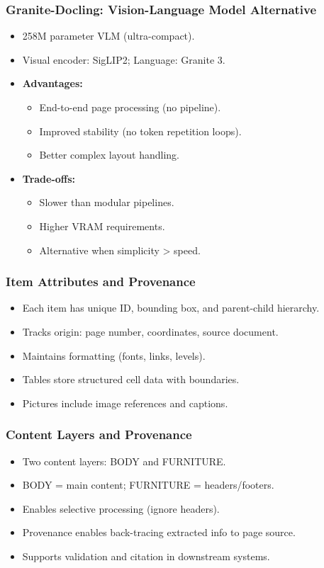 \begin{frame}[fragile]\frametitle{Granite-Docling: Vision-Language Model Alternative}
      \begin{itemize}
        \item 258M parameter VLM (ultra-compact).
        \item Visual encoder: SigLIP2; Language: Granite 3.
        \item \textbf{Advantages:}
        \begin{itemize}
          \item End-to-end page processing (no pipeline).
          \item Improved stability (no token repetition loops).
          \item Better complex layout handling.
        \end{itemize}
        \item \textbf{Trade-offs:}
        \begin{itemize}
          \item Slower than modular pipelines.
          \item Higher VRAM requirements.
          \item Alternative when simplicity > speed.
        \end{itemize}
      \end{itemize}
\end{frame}
\begin{frame}[fragile]\frametitle{Item Attributes and Provenance}
      \begin{itemize}
        \item Each item has unique ID, bounding box, and parent-child hierarchy.
        \item Tracks origin: page number, coordinates, source document.
        \item Maintains formatting (fonts, links, levels).
        \item Tables store structured cell data with boundaries.
        \item Pictures include image references and captions.
      \end{itemize}
\end{frame}

\begin{frame}[fragile]\frametitle{Content Layers and Provenance}
      \begin{itemize}
        \item Two content layers: BODY and FURNITURE.
        \item BODY = main content; FURNITURE = headers/footers.
        \item Enables selective processing (ignore headers).
        \item Provenance enables back-tracing extracted info to page source.
        \item Supports validation and citation in downstream systems.
      \end{itemize}
\end{frame}

